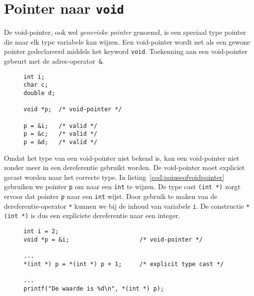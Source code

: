 \section{Pointer naar \texttt{void}}
\label{sec:pointertovoid}

De void-pointer, ook wel \textsl{generieke pointer} genoemd, is een speciaal type pointer die naar elk type variabele kan wijzen. Een void-pointer wordt net als een gewone pointer gedeclareerd middels het keyword \texttt{void}. Toekenning aan een void-pointer gebeurt met de adres-operator~\texttt{\&}.

\begin{figure}[!ht]
\begin{lstlisting}[caption=Definitie en initialisatie van een \texttt{void}-pointer.]
int i;
char c;
double d;

void *p;  /* void-pointer */

p = &i;   /* valid */
p = &c;   /* valid */
p = &d;   /* valid */
\end{lstlisting}
\end{figure}

Omdat het type van een void-pointer niet bekend is, kan een void-pointer niet zonder meer in een dereferentie gebruikt worden. De void-pointer moet expliciet gecast worden naar het correcte type. In listing~\ref{cod:poiuseofvoidpointer} gebruiken we pointer \texttt{p} om naar een \texttt{int} te wijzen. De type cast \texttt{(int *)} zorgt ervoor dat pointer \texttt{p} naar een \texttt{int} wijst. Door gebruik te maken van de dereferentie-operator \texttt{*} kunnen we bij de inhoud van variabele \texttt{i}. De constructie \texttt{*(int *)} is dus een expliciete dereferentie naar een integer.

\begin{figure}[!ht]
\begin{lstlisting}[caption={Definitie, initialisatie en deference van een \texttt{void}-pointer.},label=cod:poiuseofvoidpointer]
int i = 2;
void *p = &i;                    /* void-pointer */

...
*(int *) p = *(int *) p + 1;     /* explicit type cast */

...
printf("De waarde is %d\n", *(int *) p);
\end{lstlisting}
\end{figure}


